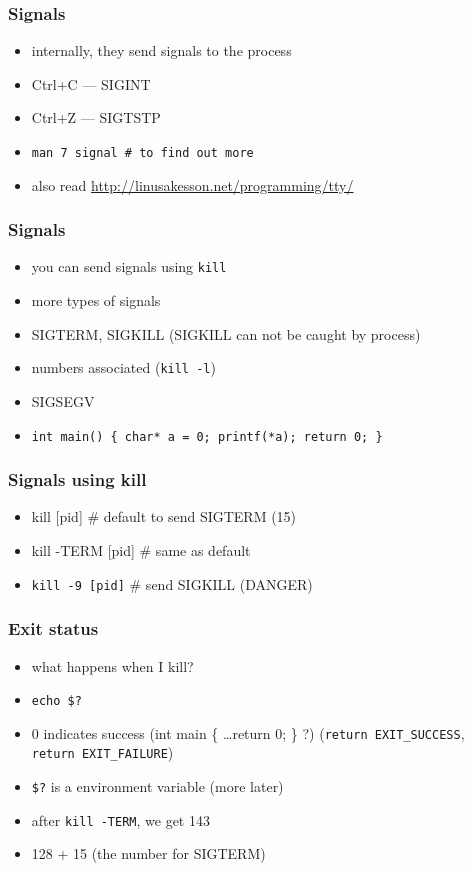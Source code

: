 \documentclass[%
        hyperref={%
                pdfauthor={Zakariyya Mughal},%
                pdfpagemode={None},pdfpagelayout={SinglePage}}%
        xcolor={x11names},%
]{beamer}
\begin{document}
\begin{frame}
	\frametitle{Signals}
	\begin{itemize}
		\item internally, they send signals to the process
		\item Ctrl+C --- SIGINT
		\item Ctrl+Z --- SIGTSTP
		\pause\item \texttt{man 7 signal \# to find out more}
		\item also read \url{http://linusakesson.net/programming/tty/}
	\end{itemize}
\end{frame}
\begin{frame}
	\frametitle{Signals}
	\begin{itemize}
		\item you can send signals using \texttt{kill}
		\pause\item more types of signals
		\pause\item SIGTERM, SIGKILL \pause (SIGKILL can not be caught by process)
		\pause\item numbers associated (\texttt{kill -l})
		\pause\item SIGSEGV
		\item	\texttt{int main() \{ char* a = 0; printf(*a); return 0; \}}
					
	\end{itemize}
\end{frame}
\begin{frame}
	\frametitle{Signals using kill}
	\begin{itemize}
		\item kill [pid] \# default to send SIGTERM (15)
		\pause\item kill -TERM [pid] \# same as default
		\pause\item \texttt{kill -9 [pid]} \# send SIGKILL (DANGER)
	\end{itemize}
\end{frame}
\begin{frame}
	\frametitle{Exit status}
	\begin{itemize}
		\item what happens when I kill?
		\pause\item \texttt{echo \$?}
		\pause\item 0 indicates success \pause (int main \{ \ldots return 0; \} ?)
			\pause (\texttt{return EXIT\_SUCCESS}, \texttt{return EXIT\_FAILURE})
		\pause\item \texttt{\$?} is a environment variable (more later)
		\pause\item after \texttt{kill -TERM}, we get 143
		\pause\item 128 + 15 (the number for SIGTERM)
	\end{itemize}
\end{frame}
\end{document}
